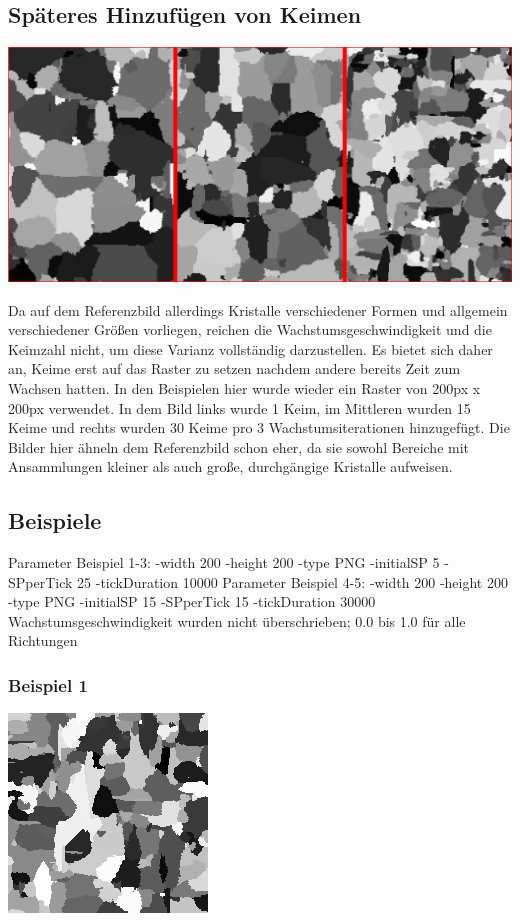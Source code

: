 \documentclass[a4paper,10pt,ngerman]{scrartcl}
\begin{document}
\subsection{Späteres Hinzufügen von Keimen}
\centerline{\includegraphics{collage1}}
Da auf dem Referenzbild allerdings Kristalle verschiedener Formen und allgemein verschiedener Größen vorliegen, reichen die Wachstumsgeschwindigkeit und die Keimzahl nicht, um diese Varianz vollständig darzustellen. Es bietet sich daher an, Keime erst auf das Raster zu setzen nachdem andere bereits Zeit zum Wachsen hatten.
In den Beispielen hier wurde wieder ein Raster von 200px x 200px verwendet. In dem Bild links wurde 1 Keim, im Mittleren wurden 15 Keime und rechts wurden 30 Keime pro 3 Wachstumsiterationen hinzugefügt. Die Bilder hier ähneln dem Referenzbild schon eher, da sie sowohl Bereiche mit Ansammlungen kleiner als auch große, durchgängige Kristalle aufweisen.
\subsection{Beispiele}
Parameter Beispiel 1-3: -width 200 -height 200 -type PNG -initialSP 5 -SPperTick 25 -tickDuration 10000
Parameter Beispiel 4-5: -width 200 -height 200 -type PNG -initialSP 15 -SPperTick 15 -tickDuration 30000
Wachstumsgeschwindigkeit wurden nicht überschrieben; 0.0 bis 1.0 für alle Richtungen
\subsubsection{Beispiel 1}
\centerline{\includegraphics{beispiel1}}
\end{document}
